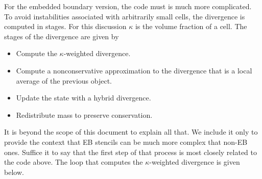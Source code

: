 For the embedded boundary version, the code must is much more
complicated. To avoid instabilities associated with arbitrarily small
cells, the divergence is computed in stages.  For this discussion
$\kappa$ is the volume fraction of a cell.  The stages of the
divergence are given by
\begin{itemize}
\item Compute the $\kappa$-weighted divergence.
\item Compute a nonconservative approximation to the divergence that
  is a local average of the previous object.
\item Update the state with a hybrid divergence.
\item Redistribute  mass to preserve conservation.
\end{itemize}
It is beyond the scope of this document to explain all that.  We
include it only to provide the context that EB stencils can be much
more complex that non-EB ones.   Suffice
it to say that the first step of that process is most closely related
to the code above.    The loop that computes the $\kappa$-weighted
divergence is given below.

